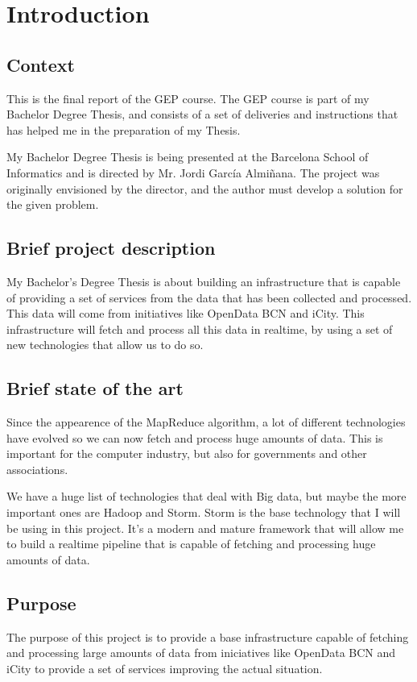 
\section{Introduction}

\subsection{Context}

This is the final report of the GEP course. The GEP course is part of my
Bachelor Degree Thesis, and consists of a set of deliveries and instructions
that has helped me in the preparation of my Thesis.

My Bachelor Degree Thesis is being presented at the Barcelona School of
Informatics and is directed by Mr. Jordi García Almiñana. The project was
originally envisioned by the director, and the author must develop a solution
for the given problem.

\subsection{Brief project description}

My Bachelor's Degree Thesis is about building an infrastructure that is
capable of providing a set of services from the data that has been collected
and processed. This data will come from initiatives like OpenData BCN and
iCity. This infrastructure will fetch and process all this data in realtime,
by using a set of new technologies that allow us to do so.

\subsection{Brief state of the art}

Since the appearence of the MapReduce algorithm, a lot of different
technologies have evolved so we can now fetch and process huge amounts of data.
This is important for the computer industry, but also for governments and other
associations.

We have a huge list of technologies that deal with Big data, but maybe the more
important ones are Hadoop and Storm. Storm is the base technology that I will be
using in this project. It's a modern and mature framework that will allow me to
build a realtime pipeline that is capable of fetching and processing huge
amounts of data.

\subsection{Purpose}

The purpose of this project is to provide a base infrastructure capable of
fetching and processing large amounts of data from iniciatives like OpenData
BCN and iCity to provide a set of services improving the actual situation.
